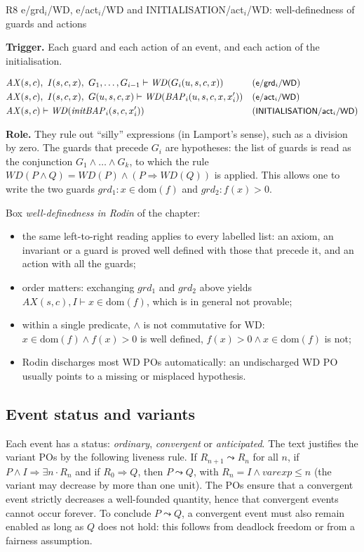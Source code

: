 \documentclass[11pt,a4paper]{article}
\newcommand{\limp}{\Rightarrow}
\newcommand{\dom}{\mathrm{dom}}
\newcommand{\WD}{\mathit{WD}}
\newcommand{\AX}{\mathit{AX}(s,c)}
\newcommand{\po}[1]{\textsf{\small #1}}
\newcommand{\champ}[1]{\par\smallskip\noindent\textbf{#1}\enspace}
\begin{document}
\begin{regle}{R8 \quad \po{e/grd$_i$/WD}, \po{e/act$_i$/WD} and \po{INITIALISATION/act$_i$/WD}: well-definedness of guards and actions}
  \champ{Trigger.} Each guard and each action of an event, and each action of the
  initialisation.
  
  \begin{align*}
    &\AX,\ I(s,c,x),\ G_1,\dots,G_{i-1} \vdash \WD(G_i(u,s,c,x)) && (\po{e/grd$_i$/WD})\\
    &\AX,\ I(s,c,x),\ G(u,s,c,x) \vdash \WD(\mathit{BAP}_i(u,s,c,x,x_i')) && (\po{e/act$_i$/WD})\\
    &\AX \vdash \WD(\mathit{initBAP}_i(s,c,x_i')) && (\po{INITIALISATION/act$_i$/WD})
  \end{align*}
  \champ{Role.} They rule out ``silly'' expressions (in Lamport's sense), such as a
  division by zero. The guards that precede $G_i$ are hypotheses: the list of
  guards is read as the conjunction $G_1\wedge\dots\wedge G_k$, to which the rule
  $\WD(P\wedge Q)=\WD(P)\wedge(P\limp\WD(Q))$ is applied. This allows one to write
  the two guards $grd_1 : x\in\dom(f)$ and $grd_2 : f(x)>0$.
\end{regle}
\begin{rodin}
  Box \emph{well-definedness in Rodin} of the chapter:
  \begin{itemize}
    \item the same left-to-right reading applies to every labelled list: an axiom,
      an invariant or a guard is proved well defined with those that precede it,
      and an action with all the guards;
    \item order matters: exchanging $grd_1$ and $grd_2$ above yields
      $\AX, I\vdash x\in\dom(f)$, which is in general not provable;
    \item within a single predicate, $\wedge$ is not commutative for WD:
      $x\in\dom(f)\wedge f(x)>0$ is well defined, $f(x)>0\wedge x\in\dom(f)$ is not;
    \item Rodin discharges most \po{WD} POs automatically: an undischarged \po{WD} PO
      usually points to a missing or misplaced hypothesis.
  \end{itemize}
\end{rodin}

\subsection{Event status and variants}\label{sec:statut}
Each event has a status: \emph{ordinary}, \emph{convergent} or
\emph{anticipated}. The text justifies the variant POs by the following liveness
rule. If $R_{n+1}\leadsto R_n$ for all $n$, if $P\wedge I\limp\exists n\cdot R_n$
and if $R_0\limp Q$, then $P\leadsto Q$, with
$R_n \widehat{=} I\wedge \mathit{varexp}\le n$ (the variant may decrease
by more than one unit). The POs ensure that a convergent event strictly decreases a
well-founded quantity, hence that convergent events cannot occur forever. To
conclude $P\leadsto Q$, a convergent event must also remain enabled as long as $Q$
does not hold: this follows from deadlock freedom or from a fairness assumption.
\end{document}
